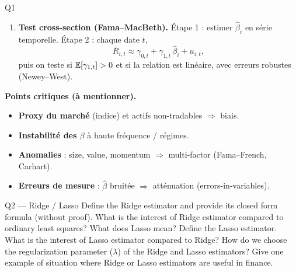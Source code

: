 \begin{solutionbox}{Q1}
\begin{enumerate}[leftmargin=*,label=\arabic*)]
  \item \textbf{Test cross-section (Fama--MacBeth).} Étape 1 : estimer $\hat\beta_i$ en série temporelle. Étape 2 : chaque date $t$,
  \[
  \bar R_{i,t} \approx \gamma_{0,t} + \gamma_{1,t}\,\hat\beta_i + u_{i,t},
  \]
  puis on teste si $\mathbb{E}[\gamma_{1,t}]>0$ et si la relation est linéaire, avec erreurs robustes (Newey--West).
\end{enumerate}

\medskip
\textbf{Points critiques (à mentionner).}
\begin{itemize}[leftmargin=*]
  \item \textbf{Proxy du marché} (indice) et actifs non-tradables $\Rightarrow$ biais.
  \item \textbf{Instabilité des $\beta$} à haute fréquence / régimes.
  \item \textbf{Anomalies} : size, value, momentum $\Rightarrow$ multi-factor (Fama--French, Carhart).
  \item \textbf{Erreurs de mesure} : $\hat\beta$ bruitée $\Rightarrow$ atténuation (errors-in-variables).
\end{itemize}
\end{solutionbox}

\begin{questionbox}{Q2 --- Ridge / Lasso}
Define the Ridge estimator and provide its closed form formula (without proof). What is the interest of Ridge estimator compared to ordinary least squares? What does Lasso mean? Define the Lasso estimator. What is the interest of Lasso estimator compared to Ridge? How do we choose the regularization parameter ($\lambda$) of the Ridge and Lasso estimators? Give one example of situation where Ridge or Lasso estimators are useful in finance.
\end{questionbox}

